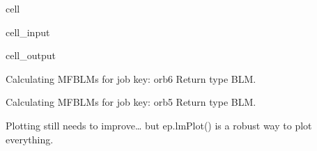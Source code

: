 \documentclass[letterpaper,10pt,english]{jupyterBook}
\begin{document}
\begin{sphinxuseclass}{cell}\begin{sphinxVerbatimInput}

\begin{sphinxuseclass}{cell_input}
\begin{sphinxVerbatim}[commandchars=\\\{\}]
\end{sphinxVerbatim}

\end{sphinxuseclass}\end{sphinxVerbatimInput}
\begin{sphinxVerbatimOutput}

\begin{sphinxuseclass}{cell_output}
\begin{sphinxVerbatim}[commandchars=\\\{\}]
Calculating MF\PYGZhy{}BLMs for job key: orb6
Return type BLM.

Calculating MF\PYGZhy{}BLMs for job key: orb5
Return type BLM.
\end{sphinxVerbatim}

\end{sphinxuseclass}\end{sphinxVerbatimOutput}

\end{sphinxuseclass}
\sphinxAtStartPar
Plotting still needs to improve… but ep.lmPlot() is a robust way to plot everything.
\end{document}
